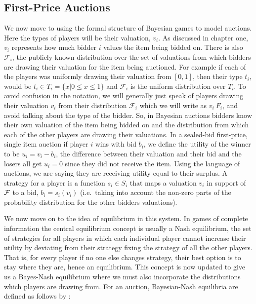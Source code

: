 \documentclass[12pt,twoside]{reedthesis}
\begin{document}
\subsection{First-Price Auctions}
We now move to using the formal structure of Bayesian games to model auctions. Here the types of players will be their valuation, $v_i$. As discussed in chapter one, $v_i$ represents how much bidder $i$ values the item being bidded on. There is also $\mathcal{F}_i$, the publicly known distribution over the set of valuations from which bidders are drawing their valuation for the item being auctioned. For example if each of the players was uniformly drawing their valuation from $[0,1]$, then their type $t_i$, would be $t_i \in T_i = \{x | 0 \leq x \leq 1\}$ and $\mathcal{F}_i$ is the uniform distribution over $T_i$. To avoid confusion in the notation, we will generally just speak of players drawing their valuation $v_i$ from their distribution $\mathcal{F}_i$ which we will write as $v_i ~ F_i$, and avoid talking about the type of the bidder. So, in Bayesian auctions bidders know their own valuation of the item being bidded on and the distribution from which each of the other players are drawing their valuations. In a sealed-bid first-price, single item auction if player $i$ wins with bid $b_i$, we define the utility of the winner to be $u_i = v_i - b_i$, the difference between their valuation and their bid and the losers all get $u_i = 0$ since they did not receive the item. Using the language of auctions, we are saying they are receiving utility equal to their surplus. A strategy for a player is a function $s_i \in S_i$ that maps a valuation $v_i$ in support of $\mathcal{F}$ to a bid, $b_i = s_i(v_i)$ (i.e.~taking into account the non-zero parts of the probability distribution for the other bidders valuations). 

We now move on to the idea of equilibrium in this system. In games of complete information the central equilibrium concept is usually a Nash equilibrium, the set of strategies for all players in which each individual player cannot increase their utility by deviating from their strategy fixing the strategy of all the other players. That is, for every player if no one else changes strategy, their best option is to stay where they are, hence an equilibrium. This concept is now updated to give us a Bayes-Nash equilibrium where we must also incorporate the distributions which players are drawing from. For an auction, Bayesian-Nash equilibria are defined as follows by \cite{Roughgarden2017}:
\end{document}
